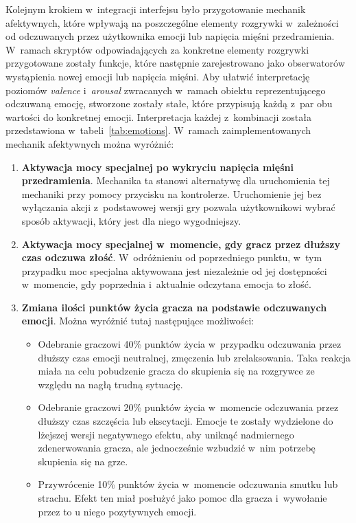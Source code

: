 Kolejnym krokiem w~integracji interfejsu było przygotowanie mechanik afektywnych, które wpływają na poszczególne elementy rozgrywki w~zależności od odczuwanych przez użytkownika emocji lub napięcia mięśni przedramienia. W~ramach skryptów odpowiadających za konkretne elementy rozgrywki przygotowane zostały funkcje, które następnie zarejestrowano jako obserwatorów wystąpienia nowej emocji lub napięcia mięśni. Aby ułatwić interpretację poziomów \textit{valence} i~\textit{arousal} zwracanych w~ramach obiektu reprezentującego odczuwaną emocję, stworzone zostały stałe, które przypisują każdą z~par obu wartości do konkretnej emocji. Interpretacja każdej z~kombinacji została przedstawiona w~tabeli~\ref{tab:emotions}. W~ramach zaimplementowanych mechanik afektywnych można wyróżnić:
\begin{enumerate}
	\item \textbf{Aktywacja mocy specjalnej po wykryciu napięcia mięśni przedramienia}. Mechanika ta stanowi alternatywę dla uruchomienia tej mechaniki przy pomocy przycisku na kontrolerze. Uruchomienie jej bez wyłączania akcji z~podstawowej wersji gry pozwala użytkownikowi wybrać sposób aktywacji, który jest dla niego wygodniejszy.
	\item \textbf{Aktywacja mocy specjalnej w~momencie, gdy gracz przez dłuższy czas odczuwa złość}. W~odróżnieniu od poprzedniego punktu, w~tym przypadku moc specjalna aktywowana jest niezależnie od jej dostępności w~momencie, gdy poprzednia i~aktualnie odczytana emocja to złość. 
	\item \textbf{Zmiana ilości punktów życia gracza na podstawie odczuwanych emocji}. Można wyróżnić tutaj następujące możliwości:
	\begin{itemize}
		\item Odebranie graczowi 40\% punktów życia w~przypadku odczuwania przez dłuższy czas emocji neutralnej, zmęczenia lub zrelaksowania. Taka reakcja miała na celu pobudzenie gracza do skupienia się na rozgrywce ze względu na nagłą trudną sytuację.
		\item Odebranie graczowi 20\% punktów życia w~momencie odczuwania przez dłuższy czas szczęścia lub ekscytacji. Emocje te zostały wydzielone do lżejszej wersji negatywnego efektu, aby uniknąć nadmiernego zdenerwowania gracza, ale jednocześnie wzbudzić w~nim potrzebę skupienia się na grze.
		\item Przywrócenie 10\% punktów życia w~momencie odczuwania smutku lub strachu. Efekt ten miał posłużyć jako pomoc dla gracza i~wywołanie przez to u niego pozytywnych emocji.
	\end{itemize}

\end{enumerate}
